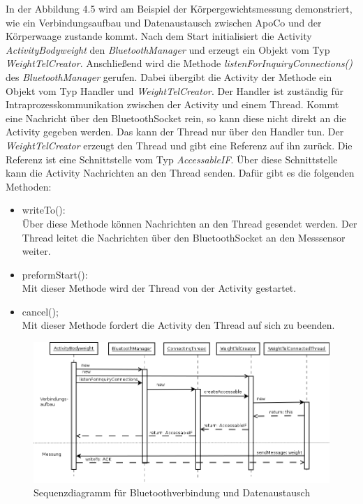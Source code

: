 In der Abbildung 4.5 wird am Beispiel der K\"orpergewichtsmessung demonstriert,
wie ein Verbindungsaufbau und Datenaustausch zwischen ApoCo und der K\"orperwaage zustande kommt.
Nach dem Start initialisiert die Activity \emph{ActivityBodyweight} den \emph{BluetoothManager} 
und erzeugt ein Objekt vom Typ \emph{WeightTelCreator}.
Anschlie\ss{}end wird die Methode \emph{listenForInquiryConnections()} des \emph{BluetoothManager} gerufen.
Dabei \"ubergibt die Activity der Methode ein Objekt vom Typ Handler und \emph{WeightTelCreator}.
Der Handler ist zust\"andig f\"ur Intraprozesskommunikation zwischen der Activity und einem Thread.
Kommt eine Nachricht \"uber den BluetoothSocket rein, so kann diese nicht direkt an die Activity gegeben werden.
Das kann der Thread nur \"uber den Handler tun.
Der \emph{WeightTelCreator} erzeugt den Thread und gibt eine Referenz auf ihn zur\"uck.
Die Referenz ist eine Schnittstelle vom Typ \emph{AccessableIF}.
\"Uber diese Schnittstelle kann die Activity Nachrichten an den Thread senden.
Daf\"ur gibt es die folgenden Methoden:

\begin{itemize}
 \item writeTo():\\
 \"Uber diese Methode k\"onnen Nachrichten an den Thread gesendet werden.
 Der Thread leitet die Nachrichten \"uber den BluetoothSocket an den Messsensor weiter.
 \item preformStart():\\
 Mit dieser Methode wird der Thread von der Activity gestartet.
 \item cancel();\\
 Mit dieser Methode fordert die Activity den Thread auf sich zu beenden.
\end{itemize}


\begin{figure}[h]
  \centering
  \includegraphics[scale=0.5]{diagramme/kapitel4/sequenzdiagramme/bt_com_aufbau_datasend.png}
  \caption{Sequenzdiagramm f\"ur Bluetoothverbindung und Datenaustausch}
  
\end{figure}


